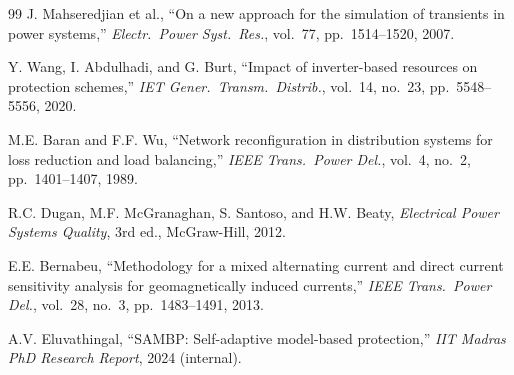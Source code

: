 \documentclass[11pt,a4paper]{report}
\begin{document}
\begin{thebibliography}{99}
J. Mahseredjian et al., ``On a new approach for the simulation of transients in power systems,'' \textit{Electr.\ Power Syst.\ Res.}, vol.~77, pp.~1514--1520, 2007.

Y. Wang, I. Abdulhadi, and G. Burt, ``Impact of inverter-based resources on protection schemes,'' \textit{IET Gener.\ Transm.\ Distrib.}, vol.~14, no.~23, pp.~5548--5556, 2020.

M.E. Baran and F.F. Wu, ``Network reconfiguration in distribution systems for loss reduction and load balancing,'' \textit{IEEE Trans.\ Power Del.}, vol.~4, no.~2, pp.~1401--1407, 1989.

R.C. Dugan, M.F. McGranaghan, S. Santoso, and H.W. Beaty, \textit{Electrical Power Systems Quality}, 3rd ed., McGraw-Hill, 2012.

E.E. Bernabeu, ``Methodology for a mixed alternating current and direct current sensitivity analysis for geomagnetically induced currents,'' \textit{IEEE Trans.\ Power Del.}, vol.~28, no.~3, pp.~1483--1491, 2013.

A.V. Eluvathingal, ``SAMBP: Self-adaptive model-based protection,'' \textit{IIT Madras PhD Research Report}, 2024 (internal).

\end{thebibliography}

\end{document}
